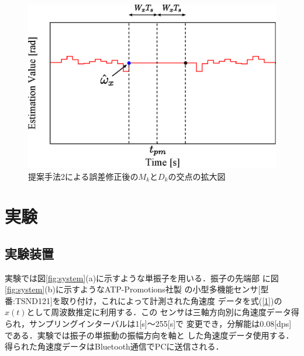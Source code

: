 \documentclass[a4paper,12pt]{jarticle}
\begin{document}
 \begin{figure}[h]
 \centering
 \includegraphics[scale=0.9]{checkmod2exp.eps}
 \hspace{103mm}
    \caption{提案手法2による誤差修正後の$M_k$と$D_k$の交点の拡大図}
		\label{checkmod2exp}
\end{figure}


\section{実験}

\subsection{実験装置}
実験では図\ref{fig:system}(a)に示すような単振子を用いる．振子の先端部
に図\ref{fig:system}(b)に示すようなATP-Promotions社製
の小型多機能センサ[型番:TSND121]を取り付け，これによって計測された角速度
データを式(\ref{1})の$x(t)$として周波数推定に利用する．この
センサは三軸方向別に角速度データ得られ，サンプリングインターバルは1[s]〜255[s]で
変更でき，分解能は0.08[dps]である．実験では振子の単振動の振幅方向を軸と
した角速度データ使用する．
得られた角速度データはBluetooth通信でPCに送信される．\\
\end{document}
